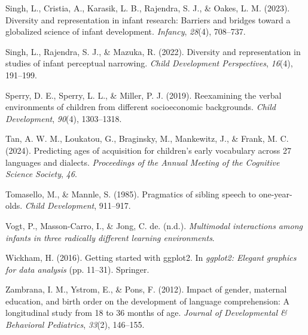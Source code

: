 \documentclass[
  man,floatsintext]{apa6}
\newlength{\cslhangindent}
\newenvironment{CSLReferences}[2] %
 {\begin{list}{}{%
  \setlength{\itemindent}{0pt}
  \setlength{\leftmargin}{0pt}
  \setlength{\parsep}{0pt}
  \ifodd #1
   \setlength{\leftmargin}{\cslhangindent}
   \setlength{\itemindent}{-1\cslhangindent}
  \fi
  \setlength{\itemsep}{#2\baselineskip}}}
 {\end{list}}
\begin{document}
\begin{CSLReferences}{1}{0}
Singh, L., Cristia, A., Karasik, L. B., Rajendra, S. J., \& Oakes, L. M. (2023). Diversity and representation in infant research: Barriers and bridges toward a globalized science of infant development. \emph{Infancy}, \emph{28}(4), 708--737.

Singh, L., Rajendra, S. J., \& Mazuka, R. (2022). Diversity and representation in studies of infant perceptual narrowing. \emph{Child Development Perspectives}, \emph{16}(4), 191--199.

Sperry, D. E., Sperry, L. L., \& Miller, P. J. (2019). Reexamining the verbal environments of children from different socioeconomic backgrounds. \emph{Child Development}, \emph{90}(4), 1303--1318.

Tan, A. W. M., Loukatou, G., Braginsky, M., Mankewitz, J., \& Frank, M. C. (2024). Predicting ages of acquisition for children's early vocabulary across 27 languages and dialects. \emph{Proceedings of the Annual Meeting of the Cognitive Science Society}, \emph{46}.

Tomasello, M., \& Mannle, S. (1985). Pragmatics of sibling speech to one-year-olds. \emph{Child Development}, 911--917.

Vogt, P., Masson-Carro, I., \& Jong, C. de. (n.d.). \emph{Multimodal interactions among infants in three radically different learning environments}.

Wickham, H. (2016). Getting started with ggplot2. In \emph{ggplot2: Elegant graphics for data analysis} (pp. 11--31). Springer.

Zambrana, I. M., Ystrom, E., \& Pons, F. (2012). Impact of gender, maternal education, and birth order on the development of language comprehension: A longitudinal study from 18 to 36 months of age. \emph{Journal of Developmental \& Behavioral Pediatrics}, \emph{33}(2), 146--155.

\end{CSLReferences}
\end{document}
